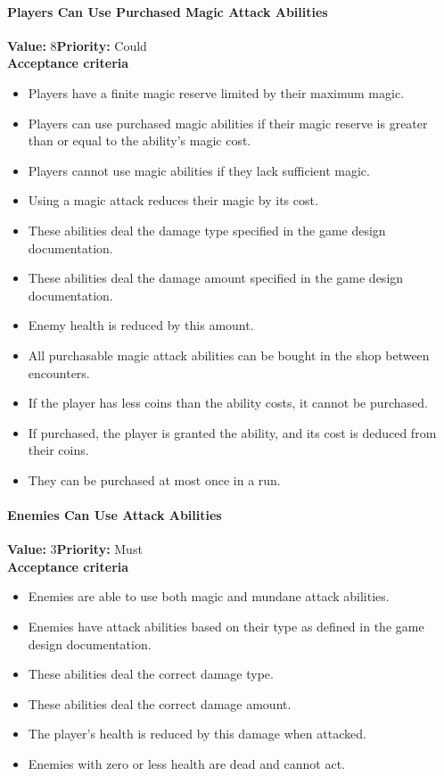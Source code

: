 \paragraph{Players Can Use Purchased Magic Attack Abilities}
\textbf{Value:} 8\quad \textbf{Priority:} Could\\
\textbf{Acceptance criteria}
\begin{itemize}
  \item Players have a finite magic reserve limited by their maximum magic.
  \item Players can use purchased magic abilities if their magic reserve is greater than or equal to the ability's magic cost.
  \item Players cannot use magic abilities if they lack sufficient magic.
  \item Using a magic attack reduces their magic by its cost.
  \item These abilities deal the damage type specified in the game design documentation.
  \item These abilities deal the damage amount specified in the game design documentation.
  \item Enemy health is reduced by this amount.
  \item All purchasable magic attack abilities can be bought in the shop between encounters.
  \item If the player has less coins than the ability costs, it cannot be purchased.
  \item If purchased, the player is granted the ability, and its cost is deduced from their coins.
  \item They can be purchased at most once in a run.
\end{itemize}

\paragraph{Enemies Can Use Attack Abilities}
\textbf{Value:} 3\quad \textbf{Priority:} Must\\
\textbf{Acceptance criteria}
\begin{itemize}
  \item Enemies are able to use both magic and mundane attack abilities.
  \item Enemies have attack abilities based on their type as defined in the game design documentation.
  \item These abilities deal the correct damage type.
  \item These abilities deal the correct damage amount.
  \item The player's health is reduced by this damage when attacked.
  \item Enemies with zero or less health are dead and cannot act.
\end{itemize}


